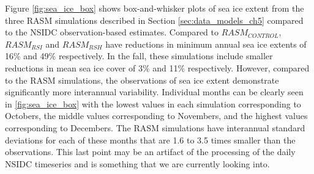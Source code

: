 Figure \ref{fig:sea_ice_box} shows box-and-whisker plots of sea ice extent from the three RASM simulations described in Section \ref{sec:data_models_ch5} compared to the NSIDC observation-based estimates.
Compared to $RASM_{CONTROL}$, $RASM_{RSI}$ and $RASM_{RSH}$ have reductions in minimum annual sea ice extents of 16\% and 49\% respectively.
In the fall, these simulations include smaller reductions in mean sea ice cover of 3\% and 11\% respectively.
However, compared to the RASM simulations, the observations of sea ice extent demonstrate significantly more interannual variability.
Individual months can be clearly seen in \ref{fig:sea_ice_box} with the lowest values in each simulation corresponding to Octobers, the middle values corresponding to Novembers, and the highest values corresponding to Decembers.
The RASM simulations have interannual standard deviations for each of these months that are 1.6 to 3.5 times smaller than the observations.
This last point may be an artifact of the processing of the daily NSIDC timeseries and is something that we are currently looking into.



